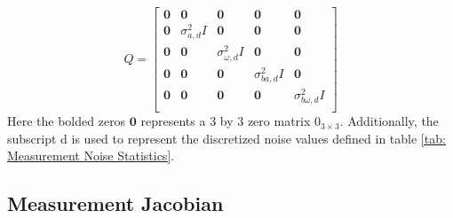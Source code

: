 \begin{equation}
    Q = \begin{bmatrix}
        \mathbf{0} & \mathbf{0} & \mathbf{0} & \mathbf{0} & \mathbf{0} \\
        \mathbf{0} & \sigma_{a,d}^2 I& \mathbf{0} & \mathbf{0} & \mathbf{0} \\
        \mathbf{0} & \mathbf{0} & \sigma_{\omega,d}^2 I & \mathbf{0} & \mathbf{0} \\
        \mathbf{0} & \mathbf{0} & \mathbf{0} & \sigma_{ba,d}^2 I  & \mathbf{0} \\
        \mathbf{0} & \mathbf{0} & \mathbf{0} & \mathbf{0} & \sigma_{b \omega,d}^2 I  \\
    \end{bmatrix}
    \label{eq: quaternion Q}
\end{equation}
Here the bolded zeros $\mathbf{0}$ represents a 3 by 3 zero matrix $0_{3 \times 3}$. Additionally, the subscript d is used to represent the discretized noise values defined in table \eqref{tab: Measurement Noise Statistics}.

\subsection{Measurement Jacobian}

